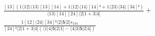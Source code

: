 \documentclass[varwidth, border=5pt]{standalone}
\begin{document}
\begin{my}
$\begin{gathered}
\scriptscriptstyle\frac{[13](1⟨12⟩⟨13⟩[13][14]+1⟨12⟩⟨14⟩[14]²+1⟨23⟩⟨34⟩[34]²)}{⟨13⟩[14][24]⟨2|1+3|4]} +\\
\scriptscriptstyle\frac{1[12]⟨24⟩[34]²⟨2|𝟓|2]s_{134}}{[24]²⟨2|1+3|4](⟨1|4|𝟓|2|1]-⟨4|3|𝟓|2|4])} \phantom{+}
\end{gathered}$
\end{my}
\end{document}
